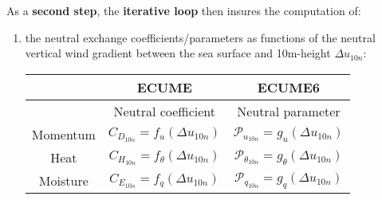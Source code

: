 As a \textbf{second step}, the \textbf{iterative loop} then insures the computation of:
\begin{enumerate}
	\item the neutral exchange coefficients/parameters as functions of the neutral vertical wind gradient 
between the sea surface and 10m-height $\Delta u_{10n}$:
		\begin{center}
\begin{tabular}{|c|c|c|}
\hline
	 & ECUME & ECUME6 \\
\hline
	 & Neutral coefficient & Neutral parameter \\
	Momentum & $C_{D_{10n}}=f_u(\Delta u_{10n})$        & $\mathcal{P}_{u_{10n}}=g_u(\Delta u_{10n})$ \\
	Heat     & $C_{H_{10n}}=f_{\theta}(\Delta u_{10n})$ & $\mathcal{P}_{{\theta}_{10n}}=g_{\theta}(\Delta u_{10n})$ \\
	Moisture & $C_{E_{10n}}=f_q(\Delta u_{10n})$        & $\mathcal{P}_{q_{10n}}=g_q(\Delta u_{10n})$ \\
\hline
\end{tabular}
		\end{center}


\end{enumerate}
